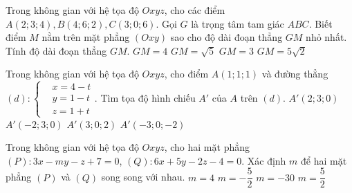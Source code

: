 \begin{ex}%
Trong không gian với hệ tọa độ $Oxyz$, cho các điểm $A(2;3;4), B(4;6;2), C(3;0;6)$. Gọi $G$ là trọng tâm tam giác $ABC$. Biết điểm $M$ nằm trên mặt phẳng $(Oxy)$ sao cho độ dài đoạn thẳng $GM$ nhỏ nhất. Tính độ dài đoạn thẳng $GM$.
\choice 
{\True $GM=4$}
{$GM=\sqrt{5}$}
{$GM=3$}
{$GM=5\sqrt{2}$}  
\end{ex} 

\begin{ex}%
Trong không gian với hệ tọa độ $Oxyz$, cho điểm $A(1;1;1)$ và đường thẳng $(d): \left \lbrace \begin{aligned} &x=4-t\\ &y=1-t  \\&z=1+t   \end{aligned} \right.$. Tìm tọa độ hình chiếu $A'$ của $A$ trên $(d)$. 
\choice 
{$A'(2;3;0)$}
{$A'(-2;3;0)$}
{\True $A'(3;0;2)$}
{$A'(-3;0;-2)$}  
\end{ex} 

\begin{ex}%
Trong không gian với hệ tọa độ $Oxyz$, cho hai mặt phẳng $(P): 3x-my-z+7=0$, $(Q): 6x+5y-2z-4=0$. Xác định $m$ để hai mặt phẳng $(P)$ và $(Q)$ song song với nhau.
\choice 
{$m=4$}
{\True $m=-\dfrac{5}{2}$}
{$m=-30$}
{$m=\dfrac{5}{2}$}  
\end{ex} 

